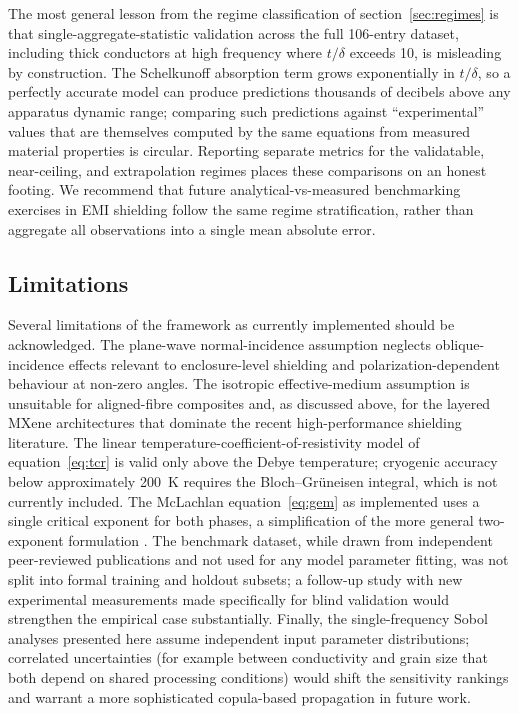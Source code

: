 \documentclass[review,3p,authoryear]{elsarticle}
\begin{document}
The most general lesson from the regime classification of section~\ref{sec:regimes} is that single-aggregate-statistic validation across the full \num{106}-entry dataset, including thick conductors at high frequency where $t/\delta$ exceeds \num{10}, is misleading by construction. The Schelkunoff absorption term grows exponentially in $t/\delta$, so a perfectly accurate model can produce predictions thousands of decibels above any apparatus dynamic range; comparing such predictions against ``experimental'' values that are themselves computed by the same equations from measured material properties is circular. Reporting separate metrics for the validatable, near-ceiling, and extrapolation regimes places these comparisons on an honest footing. We recommend that future analytical-vs-measured benchmarking exercises in EMI shielding follow the same regime stratification, rather than aggregate all observations into a single mean absolute error.

\subsection{Limitations}
\label{sec:limitations}

Several limitations of the framework as currently implemented should be acknowledged. The plane-wave normal-incidence assumption neglects oblique-incidence effects relevant to enclosure-level shielding and polarization-dependent behaviour at non-zero angles. The isotropic effective-medium assumption is unsuitable for aligned-fibre composites and, as discussed above, for the layered MXene architectures that dominate the recent high-performance shielding literature. The linear temperature-coefficient-of-resistivity model of equation~\eqref{eq:tcr} is valid only above the Debye temperature; cryogenic accuracy below approximately \SI{200}{K} requires the Bloch--Gr\"uneisen integral, which is not currently included. The McLachlan equation~\eqref{eq:gem} as implemented uses a single critical exponent for both phases, a simplification of the more general two-exponent formulation \citep{McLachlan1990}. The benchmark dataset, while drawn from independent peer-reviewed publications and not used for any model parameter fitting, was not split into formal training and holdout subsets; a follow-up study with new experimental measurements made specifically for blind validation would strengthen the empirical case substantially. Finally, the single-frequency Sobol analyses presented here assume independent input parameter distributions; correlated uncertainties (for example between conductivity and grain size that both depend on shared processing conditions) would shift the sensitivity rankings and warrant a more sophisticated copula-based propagation in future work.
\end{document}
